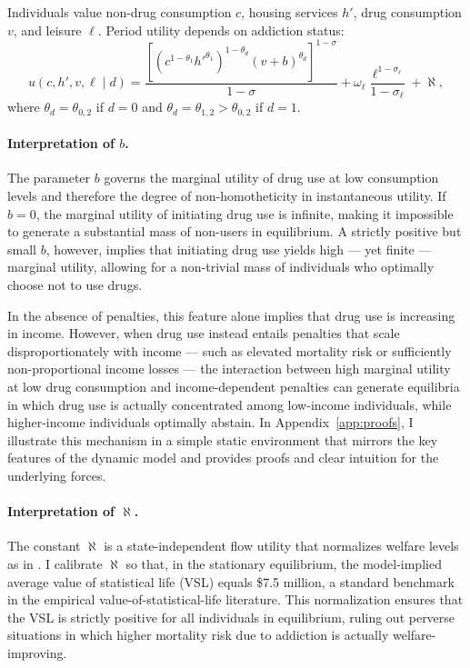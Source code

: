\documentclass[parskip=full]{article}
\theoremstyle{plain}
\theoremstyle{definition}
\theoremstyle{remark}
\begin{document}
Individuals value non-drug consumption $c$, housing services $h'$, drug consumption $v$, and leisure $\ell$. Period utility depends on addiction status:
\begin{equation}\label{eq:utility}
u\!\left(c,h',v,\ell \mid d\right)=\frac{\left[(c^{1-\theta_1}h'^{\theta_1})^{1-\theta_{d}}(v+b)^{\theta_{d}}\right]^{1-\sigma}}{1-\sigma} +\omega_\ell\frac{\ell^{1-\sigma_\ell}}{1-\sigma_\ell}+\aleph,
\end{equation}
where $\theta_{d}=\theta_{0,2}$ if $d=0$ and $\theta_{d}=\theta_{1,2}>\theta_{0,2}$ if $d=1$.

\paragraph{Interpretation of $b$.}
The parameter $b$ governs the marginal utility of drug use at low consumption levels and therefore the degree of non-homotheticity in instantaneous utility. If $b=0$, the marginal utility of initiating drug use is infinite, making it impossible to generate a substantial mass of non-users in equilibrium. A strictly positive but small $b$, however, implies that initiating drug use yields high — yet finite — marginal utility, allowing for a non-trivial mass of individuals who optimally choose not to use drugs.

In the absence of penalties, this feature alone implies that drug use is increasing in income. However, when drug use instead entails penalties that scale disproportionately with income — such as elevated mortality risk or sufficiently non-proportional income losses — the interaction between high marginal utility at low drug consumption and income-dependent penalties can generate equilibria in which drug use is actually concentrated among low-income individuals, while higher-income individuals optimally abstain. In Appendix~\ref{app:proofs}, I illustrate this mechanism in a simple static environment that mirrors the key features of the dynamic model and provides proofs and clear intuition for the underlying forces.

\paragraph{Interpretation of $\aleph$.}
The constant $\aleph$ is a state-independent flow utility that normalizes welfare levels as in \citet{hall_jones_2007}. I calibrate $\aleph$ so that, in the stationary equilibrium, the model-implied average value of statistical life (VSL) equals \$7.5 million, a standard benchmark in the empirical value-of-statistical-life literature. This normalization ensures that the VSL is strictly positive for all individuals in equilibrium, ruling out perverse situations in which higher mortality risk due to addiction is actually welfare-improving.
\end{document}
